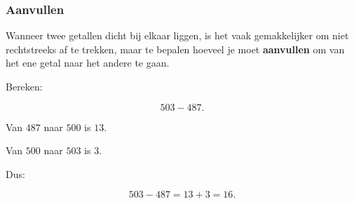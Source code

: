 \documentclass{ximera}
\begin{document}

\subsubsection*{Aanvullen}

Wanneer twee getallen dicht bij elkaar liggen, is het vaak gemakkelijker
om niet rechtstreeks af te trekken, maar te bepalen hoeveel je moet
\textbf{aanvullen} om van het ene getal naar het andere te gaan.

\begin{voorbeeld}

Bereken:

\[
503-487.
\]

Van \(487\) naar \(500\) is \(13\).

Van \(500\) naar \(503\) is \(3\).

Dus:

\[
503-487
=
13+3
=
16.
\]

\end{voorbeeld}
\end{document}
